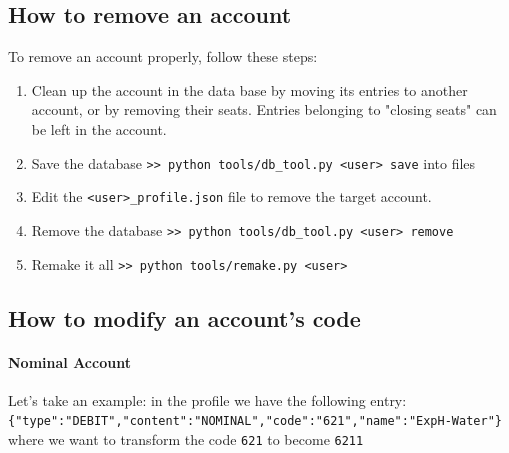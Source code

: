 \documentclass[12pt, a4paper]{article}
\begin{document}
\subsection{How to remove an account}
To remove an account properly, follow these steps:
\begin{enumerate}
	\item Clean up the account in the data base by moving its entries to another account, or by removing their seats. Entries belonging to "closing seats" can be left in the account.
	\item Save the database \verb!>> python tools/db_tool.py <user> save! into files
	\item Edit the \verb!<user>_profile.json! file to remove the target account.
	\item Remove the database \verb!>> python tools/db_tool.py <user> remove!
	\item Remake  it all \verb!>> python tools/remake.py <user>!
\end{enumerate}
	
\subsection{How to modify an account's code}  \label{NOMINAL_CODE}
\paragraph{Nominal Account} Let's take an example: in the profile we have the following entry:\\
\verb!{"type":"DEBIT","content":"NOMINAL","code":"621","name":"ExpH-Water"}!
where we want to transform the code \verb!621! to become \verb!6211!
\end{document}

